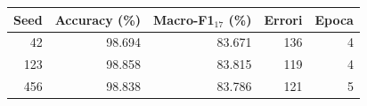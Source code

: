 \begin{tabular}{rrrrr}
\toprule
Seed & Accuracy (\%) & Macro-F1$_{17}$ (\%) & Errori & Epoca \\
\midrule
42 & 98.694 & 83.671 & 136 & 4 \\
123 & 98.858 & 83.815 & 119 & 4 \\
456 & 98.838 & 83.786 & 121 & 5 \\
\bottomrule
\end{tabular}